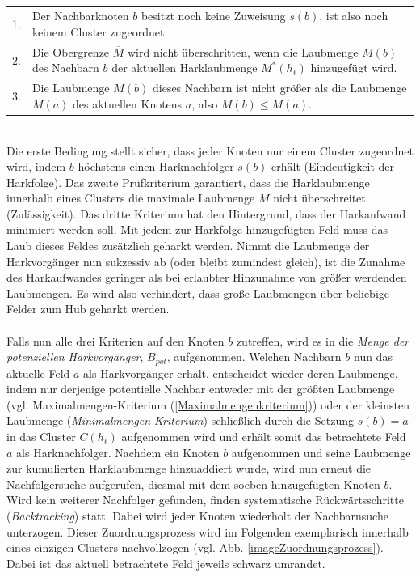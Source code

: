 \documentclass[fontsize=12pt,doubleside,openany,listof=totoc,listof=flat,listof=nochaptergap,numbers=noenddot]{scrbook}
\theoremstyle{style}
\begin{document}
\phantom \\
\begin{tabular}{lp{13cm}}
1.&Der Nachbarknoten $b$ besitzt noch keine Zuweisung $s(b)$, ist also noch keinem Cluster zugeordnet.\\
2.&Die Obergrenze $\overline{M}$ wird nicht überschritten, wenn die Laubmenge
$M(b)$ des Nachbarn $b$ der aktuellen Harklaubmenge $M^*(h_{\ell})$ hinzugefügt wird.\\
3.&Die Laubmenge $M(b)$ dieses Nachbarn ist nicht größer als die Laubmenge $M(a)$ des aktuellen Knotens $a$, also $M(b) \leq M(a)$.
\end{tabular}

\phantom \\
\noindent Die erste Bedingung stellt sicher, dass jeder Knoten nur einem Cluster zugeordnet wird, indem $b$ höchstens einen Harknachfolger $s(b)$ erhält (Eindeutigkeit der Harkfolge). Das zweite Prüfkriterium garantiert, dass die Harklaubmenge innerhalb eines Clusters die maximale Laubmenge $\overline{M}$ nicht überschreitet (Zulässigkeit). Das dritte Kriterium hat den Hintergrund, dass der Harkaufwand minimiert werden soll. Mit jedem zur Harkfolge hinzugefügten Feld muss das Laub dieses Feldes zusätzlich geharkt werden. Nimmt die Laubmenge der Harkvorgänger nun sukzessiv ab (oder bleibt zumindest gleich), ist die Zunahme des Harkaufwandes geringer als bei erlaubter Hinzunahme von größer werdenden Laubmengen. Es wird also verhindert, dass große Laubmengen über beliebige Felder zum Hub geharkt werden.\\
\\ 
Falls nun alle drei Kriterien auf den Knoten $b$ zutreffen, wird es in die
\textit{Menge der potenziellen Harkvorgänger}, $B_{pot}$, aufgenommen. Welchen Nachbarn $b$ nun das aktuelle Feld $a$ als Harkvorgänger erhält, entscheidet wieder deren Laubmenge, indem nur derjenige potentielle Nachbar entweder mit der größten Laubmenge (vgl. Maximalmengen-Kriterium (\ref{Maximalmengenkriterium})) oder der kleinsten Laubmenge (\textit{Minimalmengen-Kriterium}) schließlich durch die Setzung $s(b)=a$ in das Cluster $C(h_{\ell})$ aufgenommen wird und erhält somit das betrachtete Feld $a$ als Harknachfolger. Nachdem ein Knoten $b$ aufgenommen und seine Laubmenge zur kumulierten Harklaubmenge hinzuaddiert wurde, wird nun erneut die Nachfolgersuche aufgerufen, diesmal mit dem soeben hinzugefügten Knoten $b$. 
Wird kein weiterer Nachfolger gefunden, finden systematische Rückwärtsschritte (\textit{Backtracking}) statt. Dabei wird jeder Knoten wiederholt der Nachbarnsuche unterzogen. Dieser Zuordnungsprozess wird im Folgenden exemplarisch innerhalb eines einzigen Clusters nachvollzogen (vgl. Abb. \ref{imageZuordnungsprozess}). Dabei ist das aktuell betrachtete Feld jeweils schwarz umrandet.\\
\end{document}
